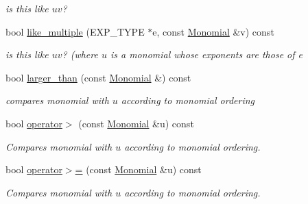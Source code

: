 \begin{Indent}
\begin{DoxyCompactItemize}
\begin{DoxyCompactList}\small\item\em is {\ttfamily this} like $uv$? \end{DoxyCompactList}\item 
\mbox{\label{group__polygroup_ab2989052f946017870269c19b2108b55}} 
bool \hyperlink{group__polygroup_ab2989052f946017870269c19b2108b55}{like\+\_\+multiple} (E\+X\+P\+\_\+\+T\+Y\+PE $\ast$e, const \hyperlink{group__polygroup_class_monomial}{Monomial} \&v) const
\begin{DoxyCompactList}\small\item\em is {\ttfamily this} like $uv$? (where $u$ is a monomial whose exponents are those of {\ttfamily e} \end{DoxyCompactList}\item 
\mbox{\label{group__polygroup_ab50a4f90c210bcaf6e21fc16028a121a}} 
bool \hyperlink{group__polygroup_ab50a4f90c210bcaf6e21fc16028a121a}{larger\+\_\+than} (const \hyperlink{group__polygroup_class_monomial}{Monomial} \&) const
\begin{DoxyCompactList}\small\item\em compares monomial with $u$ according to monomial ordering \end{DoxyCompactList}\item 
\mbox{\label{group__polygroup_ad660e085a10e15ba0e13bcd9790994d0}} 
bool \hyperlink{group__polygroup_ad660e085a10e15ba0e13bcd9790994d0}{operator$>$} (const \hyperlink{group__polygroup_class_monomial}{Monomial} \&u) const
\begin{DoxyCompactList}\small\item\em Compares monomial with $u$ according to monomial ordering. \end{DoxyCompactList}\item 
\mbox{\label{group__polygroup_ae6607ae89a4e6ee332b3a69266d133d9}} 
bool \hyperlink{group__polygroup_ae6607ae89a4e6ee332b3a69266d133d9}{operator$>$=} (const \hyperlink{group__polygroup_class_monomial}{Monomial} \&u) const
\begin{DoxyCompactList}\small\item\em Compares monomial with $u$ according to monomial ordering. \end{DoxyCompactList}\item 

\end{DoxyCompactItemize}
\end{Indent}
